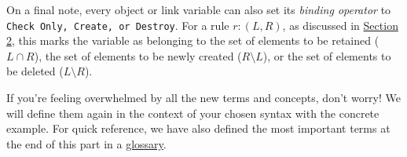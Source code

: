 On a final note, every object or link variable can also set its \emph{binding operator} to \texttt{Check Only, Create, or Destroy}. For a rule $r: (L,
R)$, as discussed in \hyperlink{explanation}{Section 2}, this marks the variable as belonging to the set of elements to be retained ($L\cap R$), the set of
elements to be newly created ($R\setminus L$), or the set of elements to be deleted ($L\setminus R$).

If you're feeling overwhelmed by all the new terms and concepts, don't worry! We will define them again in the context of your chosen syntax with the
concrete example. For quick reference, we have also defined the most important terms at the end of this part in a \hyperlink{glossary}{glossary}. 








